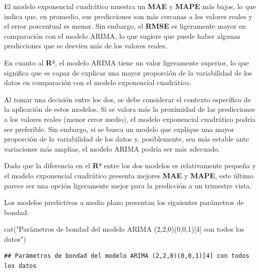 \documentclass[
]{article}
\newenvironment{Shaded}{\begin{snugshade}}{\end{snugshade}}
\newcommand{\FunctionTok}[1]{\textcolor[rgb]{0.00,0.00,0.00}{#1}}
\newcommand{\NormalTok}[1]{#1}
\newcommand{\SpecialCharTok}[1]{\textcolor[rgb]{0.00,0.00,0.00}{#1}}
\newcommand{\StringTok}[1]{\textcolor[rgb]{0.31,0.60,0.02}{#1}}
\begin{document}
El modelo exponencial cuadrático muestra un \textbf{MAE} y \textbf{MAPE}
más bajos, lo que indica que, en promedio, sus predicciones son más
cercanas a los valores reales y el error porcentual es menor. Sin
embargo, el \textbf{RMSE} es ligeramente mayor en comparación con el
modelo ARIMA, lo que sugiere que puede haber algunas predicciones que se
desvíen más de los valores reales.

En cuanto al \textbf{R²}, el modelo ARIMA tiene un valor ligeramente
superior, lo que significa que es capaz de explicar una mayor proporción
de la variabilidad de los datos en comparación con el modelo exponencial
cuadrático.

Al tomar una decisión entre los dos, se debe considerar el contexto
específico de la aplicación de estos modelos. Si se valora más la
proximidad de las predicciones a los valores reales (menor error medio),
el modelo exponencial cuadrático podría ser preferible. Sin embargo, si
se busca un modelo que explique una mayor proporción de la variabilidad
de los datos y, posiblemente, sea más estable ante variaciones más
amplias, el modelo ARIMA podría ser más adecuado.

Dado que la diferencia en el \textbf{R²} entre los dos modelos es
relativamente pequeña y el modelo exponencial cuadrático presenta
mejores \textbf{MAE} y \textbf{MAPE}, este último parece ser una opción
ligeramente mejor para la predicción a un trimestre vista.

Los modelos predictivos a medio plazo presentan los siguientes
parámetros de bondad:

\begin{Shaded}
\begin{Highlighting}[]
\FunctionTok{cat}\NormalTok{(}\StringTok{"Parámetros de bondad del modelo ARIMA (2,2,0)(0,0,1)[4] con todos los datos"}\NormalTok{)}
\end{Highlighting}
\end{Shaded}

\begin{verbatim}
## Parámetros de bondad del modelo ARIMA (2,2,0)(0,0,1)[4] con todos los datos
\end{verbatim}

\begin{Shaded}
\end{Shaded}
\end{document}
